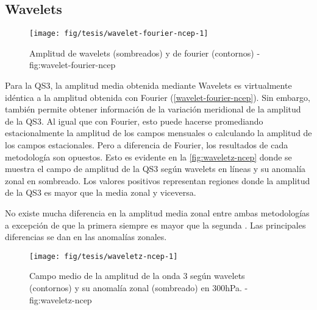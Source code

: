 \documentclass[spanish,a4paper]{book}
\begin{document}

\subsection{Wavelets}\label{wavelets}

\begin{figure}

{\centering \texttt{[image: fig/tesis/wavelet-fourier-ncep-1]} 

}

\caption{Amplitud de wavelets (sombreados) y de fourier (contornos) - fig:wavelet-fourier-ncep}\label{fig:wavelet-fourier-ncep}
\end{figure}

Para la QS3, la amplitud media obtenida mediante Wavelets
 es virtualmente idéntica a la
amplitud obtenida con Fourier (\autoref{wavelet-fourier-ncep}). Sin
embargo, también permite obtener información de la variación meridional
de la amplitud de la QS3. Al igual que con Fourier, esto puede hacerse
promediando estacionalmente la amplitud de los campos mensuales o
calculando la amplitud de los campos estacionales. Pero a diferencia de
Fourier, los resultados de cada metodología son opuestos. Esto es
evidente en la \autoref{fig:waveletz-ncep} donde se muestra el campo de
amplitud de la QS3 según wavelets en líneas y su anomalía zonal en
sombreado. Los valores positivos representan regiones donde la amplitud
de la QS3 es mayor que la media zonal y viceversa.

No existe mucha diferencia en la amplitud media zonal entre ambas
metodologías a excepción de que la primera siempre es mayor que la
segunda
.
Las principales diferencias se dan en las anomalías zonales.

\begin{figure}

{\centering \texttt{[image: fig/tesis/waveletz-ncep-1]} 

}

\caption{Campo medio de la amplitud de la onda 3 según wavelets (contornos) y su anomalía zonal (sombreado) en 300hPa. - fig:waveletz-ncep}\label{fig:waveletz-ncep}
\end{figure}
\end{document}
